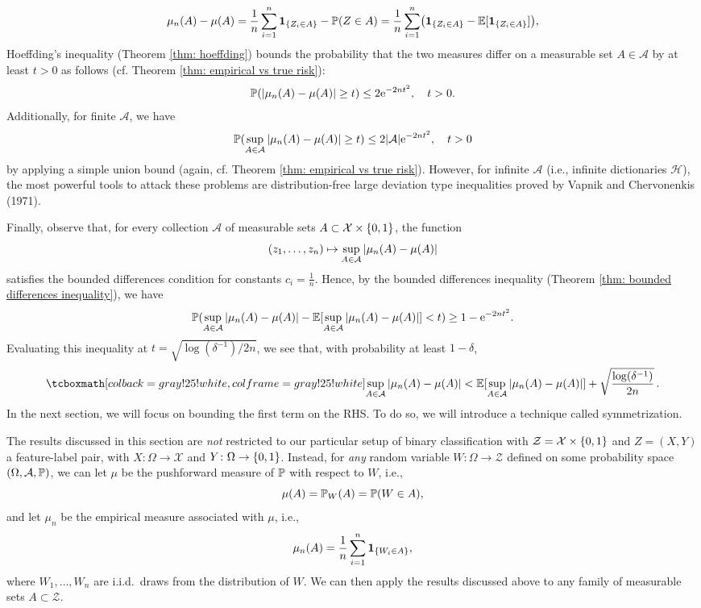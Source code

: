 \[
    \mu_n(A) - \mu(A) = \frac{1}{n} \sum_{i=1}^n \indSet{Z_i \in A} - \P(Z \in A) = \frac{1}{n} \sum_{i=1}^n \left(\indSet{Z_i \in A} - \Exp[\indSet{Z_i \in A}]\right),
\]
Hoeffding's inequality (Theorem \ref{thm: hoeffding}) bounds the probability that the two measures differ on a measurable set $A \in \mathcal{A}$ by at least $t > 0$ as follows (cf. Theorem \ref{thm: empirical vs true risk}):
\[
    \P(\abs{\mu_n(A) - \mu(A)} \geq t) \leq 2 \e^{-2nt^2}, \quad t > 0.
\]
Additionally, for finite $\mathcal{A}$, we have
\[
    \P(\sup_{A \in \mathcal{A}} \abs{\mu_n(A) - \mu(A)} \geq t) \leq 2 \abs{\mathcal{A}} \e^{-2nt^2}, \quad t > 0
\]
by applying a simple union bound (again, cf. Theorem \ref{thm: empirical vs true risk}). However, for infinite $\mathcal{A}$ (i.e., infinite dictionaries $\mathcal{H}$), the most powerful tools to attack these problems are distribution-free large deviation type inequalities proved by Vapnik and Chervonenkis (1971).

Finally, observe that, for every collection $\mathcal{A}$ of measurable sets $A \subset \mathcal{X} \times \set{0, 1}$, the function
\[
    (z_1, \dots, z_n) \mapsto \sup_{A \in \mathcal{A}} \abs{\mu_n(A) - \mu(A)}
\]
satisfies the bounded differences condition for constants $c_i = \frac{1}{n}$. Hence, by the bounded differences inequality (Theorem \ref{thm: bounded differences inequality}), we have
\[
    \P(\sup_{A \in \mathcal{A}} \abs{\mu_n(A) - \mu(A)} - \Exp[\sup_{A \in \mathcal{A}} \abs{\mu_n(A) - \mu(A)}] < t) \geq 1 - \e^{-2nt^2}.
\]
Evaluating this inequality at $t = \sqrt{\log(\delta^{-1}) / 2n}$, we see that, with probability at least $1 - \delta$,
\begin{equation}
\label{eq: upper bound on uniform deviations}
    \highlightMath{
        \sup_{A \in \mathcal{A}} \abs{\mu_n(A) - \mu(A)} < \Exp[\sup_{A \in \mathcal{A}} \abs{\mu_n(A) - \mu(A)}] + \sqrt{\frac{\log(\delta^{-1})}{2n}} \, .
    }
\end{equation}
In the next section, we will focus on bounding the first term on the RHS. To do so, we will introduce a technique called symmetrization.

\begin{remark}
The results discussed in this section are \emph{not} restricted to our particular setup of binary classification with $\mathcal{Z} = \mathcal{X} \times \set{0, 1}$ and $Z = (X, Y)$ a feature-label pair, with $X \colon \Omega \to \mathcal{X}$ and $Y \colon \Omega \to \set{0 ,1}$. Instead, for \emph{any} random variable $W \colon \Omega \to \mathcal{Z}$ defined on some probability space $(\Omega, \mathcal{A}, \P)$, we can let $\mu$ be the pushforward measure of $\P$ with respect to $W$, i.e.,
\[
    \mu(A) = \P_W(A) = \P(W \in A),
\]
and let $\mu_n$ be the empirical measure associated with $\mu$, i.e.,
\[
    \mu_n(A) = \frac{1}{n} \sum_{i=1}^n \indSet{W_i \in A},
\]
where $W_1, \dots, W_n$ are i.i.d.\ draws from the distribution of $W$. We can then apply the results discussed above to any family of measurable sets $A \subset \mathcal{Z}$.
\end{remark}
